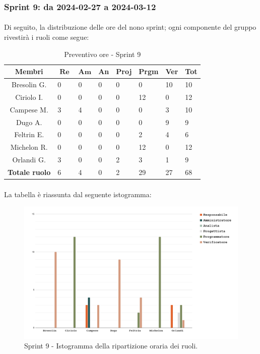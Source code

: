 \documentclass[10pt, a4paper]{article}
\begin{document}
{{{{{{{{{{{{{{{{%
\subsubsection{Sprint 9: da 2024-02-27 a 2024-03-12}
\paragraph{}Di seguito, la distribuzione delle ore del nono sprint; ogni componente del gruppo rivestirà i ruoli come segue:
\begin{table}[H]
\begin{tabularx}{\textwidth}{c|X|X|X|X|X|X|X}
        \textbf{Membri} & $\operatorname{\textbf{Re}}$ & $\mathrm{\textbf{Am}}$ & \textbf{An} & \textbf{Proj} & \textbf{Prgm} & \textbf{Ver} & \textbf{Tot} \\
        \hline Bresolin G. & 0 & 0 & 0 & 0 & 0 & 10 & \cellcolor{primarycolor}10 \\
        \hline Ciriolo I.  & 0 & 0 & 0 & 0 & \cellcolor{primarycolor}12 & 0 & 12 \\
        \hline Campese M.  & 3 & \cellcolor{primarycolor}4 & 0 & 0 & 0 & 3 & 10 \\
        \hline Dugo A.     & 0 & 0 & 0 & 0 & 0 & \cellcolor{primarycolor}9 & 9 \\
        \hline Feltrin E.  & 0 & 0 & 0 & 0 & 2 & \cellcolor{primarycolor}4 & 6 \\
        \hline Michelon R. & 0 & 0 & 0 & 0 & \cellcolor{primarycolor}12 & 0 & 12 \\
        \hline Orlandi G.  & \cellcolor{primarycolor}3 & 0 & 0 & 2 & 3 & 1 & 9 \\
        \hline
        \textbf{Totale ruolo} & 6 & 4 & 0 & 2 & 29 & 27 & 68 
    \end{tabularx}
    \caption{Preventivo ore - Sprint 9}
    \end{table}

\paragraph{}La tabella è riassunta dal seguente istogramma:
 \begin{figure}[H]
        \centering        
        \includegraphics[width=15.5cm]{istogrammi/istogramma_9_periodo.png}
        \caption{Sprint 9 - Istogramma della ripartizione oraria dei ruoli. }
    \end{figure}

}}}}}}}}}}}}}}}}
\end{document}
